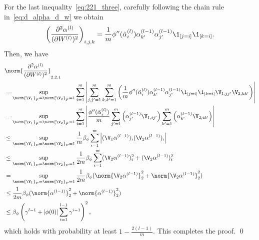 For the last inequality~\eqref{eq:221_three}, carefully following the chain rule in~\eqref{eq:d_alpha_d_w} we obtain $$\left(\frac{\partial^2 \alpha^{(l)}}{(\partial W^{(l)})^2}\right)_{i,j,k}=\frac{1}{m}\phi''(\tilde{\alpha}_i^{(l)})\alpha^{(l-1)}_{k'}\alpha^{(l-1)}_{j'}\1_{[j=i]}\1_{[k=i]}.$$
Then, we have
\begin{align*}
   &\norm{\frac{\partial^2 \alpha^{(l)}}{(\partial W^{(l)})^2}}_{2,2,1}\\
%
&=\sup_{\norm{\V_1}_F=\norm{\V_2}_F=1}\sum_{i=1}^{m}\left|\sum^m_{j,j'=1}\sum^m_{k,k'=1}\left(\frac{1}{m}\phi''(\tilde{\alpha}_i^{(l)})\alpha^{(l-1)}_{k'}\alpha^{(l-1)}_{j'}\1_{[j=i]}\1_{[k=i]}\V_{1,jj'}\V_{2,kk'}\right)\right|\\
%
&=\sup_{\norm{\V_1}_F=\norm{\V_2}_F=1}\sum_{i=1}^{m}\left|\frac{\phi''(\tilde{\alpha}_i^{(l)})}{m}\sum^m_{j'=1}\left(\alpha^{(l-1)}_{j'}\V_{1,ij'}\right)\sum^m_{k'=1}\left(\alpha^{(l-1)}_{k'}\V_{2,ik'}\right)\right|\\
%
&\leq \sup_{\norm{\V_1}_F = \norm{\V_2}_F=1}\frac{1}{m}\beta_\phi \sum_{i=1}^{m}\left|(\V_1\alpha^{(l-1)})_i(\V_2\alpha^{(l-1)})_i\right|\\
%
&\leq \sup_{\norm{\V_1}_F = \norm{\v_2}_F=1}\frac{1}{2m}\beta_\phi \sum_{i=1}^{m}(\V_2\alpha^{(l-1)})_i^2 +(\V_2\alpha^{(l-1)})_i^2\\
%
&= \sup_{\norm{\V_1}_F= \norm{\V_2}_F=1} \frac{1}{2m}\beta_\phi (\norm{\V_2\alpha^{(l-1)}}^2_2 + \norm{\V_2\alpha^{(l-1)}}_2^2)\\
%
&\leq\frac{1}{2m}\beta_\phi (\norm{\alpha^{(l-1)}}^2_2 + \norm{\alpha^{(l-1)}}_2^2)\\
%
&\leq\beta_\phi
\left( \gamma^{l-1} +  | \phi(0)| \sum_{i=1}^{l-1} \gamma^{i-1} \right)^2,
%
\end{align*}
which holds with probability at least $1-\frac{2(l-1)}{m}$. 
This completes the proof. \qed
%
%
%
%
%

